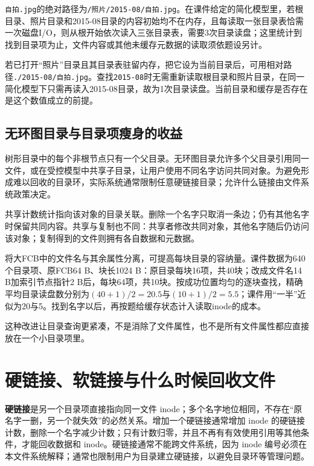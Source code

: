 \texttt{自拍.\allowbreak{}jpg}的绝对路径为\texttt{/\allowbreak{}照片/\allowbreak{}2015-08/\allowbreak{}自拍.\allowbreak{}jpg}。在课件给定的简化模型里，若根目录、照片目录和2015-08目录的内容初始均不在内存，且每读取一张目录表恰需一次磁盘I/O，则从根开始依次读入三张目录表，需要3次目录读盘；这里统计到找到目录项为止，文件内容或其他未缓存元数据的读取须依题设另计。

若已打开``照片''目录且其目录表驻留内存，把它设为当前目录后，可用相对路径\texttt{.\allowbreak{}/\allowbreak{}2015-08/\allowbreak{}自拍.\allowbreak{}jpg}。查找\texttt{2015-08}时无需重新读取根目录和照片目录，在同一简化模型下只需再读入2015-08目录，故为1次目录读盘。当前目录和缓存是否存在是这个数值成立的前提。

\subsection{无环图目录与目录项瘦身的收益}\label{OS04-directory-dag}

树形目录中的每个非根节点只有一个父目录。无环图目录允许多个父目录引用同一文件，或在受控模型中共享子目录，让用户使用不同名字访问共同对象。为避免形成难以回收的目录环，实际系统通常限制任意硬链接目录；允许什么链接由文件系统政策决定。

共享计数统计指向该对象的目录关联。删除一个名字只取消一条边；仍有其他名字时保留共同内容。共享与复制也不同：共享者修改共同对象，其他名字随后仍访问该对象；复制得到的文件则拥有各自数据和元数据。

将大FCB中的文件名与其余属性分离，可提高每块目录的容纳量。课件数据为640个目录项、原FCB64 B、块长1024 B：原目录每块16项，共40块；改成文件名14 B加索引节点指针2 B后，每块64项，共10块。按成功位置均匀的逐块查找，精确平均目录读盘数分别为\((40+1)/2=20.5\)与\((10+1)/2=5.5\)；课件用``一半''近似为20与5。找到名字以后，再按题给缓存状态计入读取inode的成本。

这种改进让目录查询更紧凑，不是消除了文件属性，也不是所有文件属性都应直接放在一个小目录项里。

\section{硬链接、软链接与什么时候回收文件}\label{OS04-6-7}

\textbf{硬链接}是另一个目录项直接指向同一文件 inode；多个名字地位相同，不存在``原名字一删，另一个就失效''的必然关系。增加一个硬链接通常增加 inode 的硬链接计数，删除一个名字减少计数；只有计数归零，并且不再有有效使用引用等其他条件，才能回收数据和 inode。硬链接通常不能跨文件系统，因为 inode 编号必须在本文件系统解释；通常也限制用户为目录建立硬链接，以避免目录环等管理问题。


